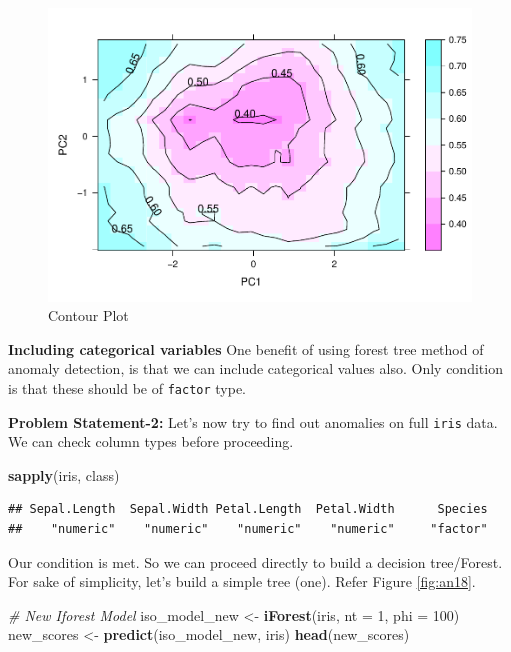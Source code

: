 \documentclass[
]{book}
\newenvironment{Shaded}{\begin{snugshade}}{\end{snugshade}}
\newcommand{\AttributeTok}[1]{\textcolor[rgb]{0.13,0.29,0.53}{#1}}
\newcommand{\CommentTok}[1]{\textcolor[rgb]{0.56,0.35,0.01}{\textit{#1}}}
\newcommand{\DecValTok}[1]{\textcolor[rgb]{0.00,0.00,0.81}{#1}}
\newcommand{\FunctionTok}[1]{\textcolor[rgb]{0.13,0.29,0.53}{\textbf{#1}}}
\newcommand{\NormalTok}[1]{#1}
\newcommand{\OtherTok}[1]{\textcolor[rgb]{0.56,0.35,0.01}{#1}}
\begin{document}
\begin{figure}

{\centering \includegraphics[width=0.9\linewidth]{DauR_files/figure-latex/an16-1} 

}

\caption{Contour Plot}\label{fig:an16}
\end{figure}

\textbf{Including categorical variables} One benefit of using forest tree method of anomaly detection, is that we can include categorical values also. Only condition is that these should be of \texttt{factor} type.

\textbf{Problem Statement-2:} Let's now try to find out anomalies on full \texttt{iris} data. We can check column types before proceeding.

\begin{Shaded}
\begin{Highlighting}[]
\FunctionTok{sapply}\NormalTok{(iris, class)}
\end{Highlighting}
\end{Shaded}

\begin{verbatim}
## Sepal.Length  Sepal.Width Petal.Length  Petal.Width      Species 
##    "numeric"    "numeric"    "numeric"    "numeric"     "factor"
\end{verbatim}

Our condition is met. So we can proceed directly to build a decision tree/Forest. For sake of simplicity, let's build a simple tree (one). Refer Figure \ref{fig:an18}.

\begin{Shaded}
\begin{Highlighting}[]
\CommentTok{\# New Iforest Model}
\NormalTok{iso\_model\_new }\OtherTok{\textless{}{-}} \FunctionTok{iForest}\NormalTok{(iris, }\AttributeTok{nt =} \DecValTok{1}\NormalTok{, }\AttributeTok{phi =} \DecValTok{100}\NormalTok{)}
\NormalTok{new\_scores }\OtherTok{\textless{}{-}} \FunctionTok{predict}\NormalTok{(iso\_model\_new, iris)}
\FunctionTok{head}\NormalTok{(new\_scores)}
\end{Highlighting}
\end{Shaded}
\end{document}
